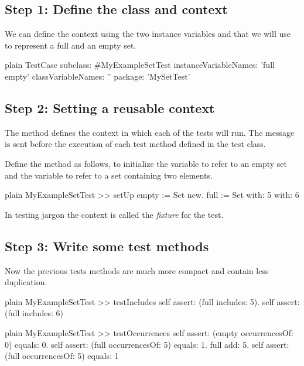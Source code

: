 \documentclass[10pt,twoside,english]{_support/latex/sbabook/sbabook}
\begin{document}
\subsection{Step 1: Define the class and context}
We can define the context using the two instance variables  and  that
we will use to represent a full and an empty set. 

\begin{displaycode}{plain}
TestCase subclass: #MyExampleSetTest
	instanceVariableNames: 'full empty'
	classVariableNames: ''
	package: 'MySetTest'
\end{displaycode}
\subsection{Step 2: Setting a reusable context}
The method  defines the context in which each of  the tests will run.
 The message  is sent before the execution of each test method defined in the test class.

Define the  method as follows, to initialize the  variable to
refer to an empty set and the  variable to refer to a set containing two
elements. 

\begin{displaycode}{plain}
MyExampleSetTest >> setUp
	empty := Set new.
	full := Set with: 5 with: 6
\end{displaycode}

In testing jargon the context is called the \textit{fixture} for the test.
\subsection{Step 3: Write some test methods}
Now the previous tests methods are much more compact and contain less duplication.

\begin{displaycode}{plain}
MyExampleSetTest >> testIncludes
	self assert: (full includes: 5).
	self assert: (full includes: 6)
\end{displaycode}

\begin{displaycode}{plain}
MyExampleSetTest >> testOccurrences
	self assert: (empty occurrencesOf: 0) equals: 0.
	self assert: (full occurrencesOf: 5) equals: 1.
	full add: 5.
	self assert: (full occurrencesOf: 5) equals: 1
\end{displaycode}
\end{document}
